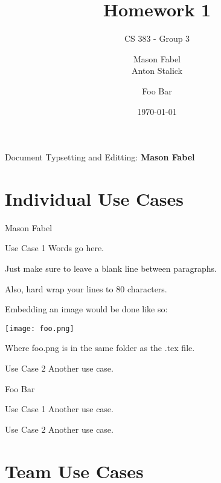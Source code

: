 \documentclass[12pt]{report}
\title{Homework 1}
\subtitle{CS 383 - Group 3}
\author{
Mason Fabel \\
Anton Stalick \\
\and Foo Bar
}
\date{\today}
\begin{document}
\maketitle

\tableofcontents
Document Typsetting and Editting: \textbf{Mason Fabel}
\clearpage

\chapter{Individual Use Cases}





\begin{section}{Mason Fabel}
\begin{subsection}{Use Case 1}
Words go here.

Just make sure to leave a blank line between paragraphs.

Also, hard wrap your lines to 80 characters.

Embedding an image would be done like so:

\texttt{[image: foo.png]}

Where foo.png is in the same folder as the .tex file.
\end{subsection}

\begin{subsection}{Use Case 2}
Another use case.
\end{subsection}
\end{section}

\begin{section}{Foo Bar}
\begin{subsection}{Use Case 1}
Another use case.
\end{subsection}

\begin{subsection}{Use Case 2}
Another use case.
\end{subsection}
\end{section}

\chapter{Team Use Cases}

\end{document}
